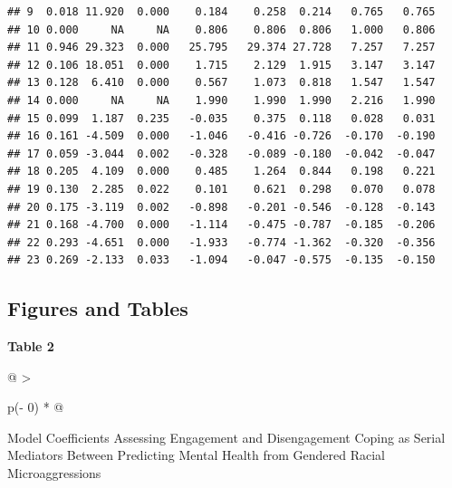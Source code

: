 \documentclass[
  11pt,
]{book}
\begin{document}
\begin{verbatim}
## 9  0.018 11.920  0.000    0.184    0.258  0.214   0.765   0.765
## 10 0.000     NA     NA    0.806    0.806  0.806   1.000   0.806
## 11 0.946 29.323  0.000   25.795   29.374 27.728   7.257   7.257
## 12 0.106 18.051  0.000    1.715    2.129  1.915   3.147   3.147
## 13 0.128  6.410  0.000    0.567    1.073  0.818   1.547   1.547
## 14 0.000     NA     NA    1.990    1.990  1.990   2.216   1.990
## 15 0.099  1.187  0.235   -0.035    0.375  0.118   0.028   0.031
## 16 0.161 -4.509  0.000   -1.046   -0.416 -0.726  -0.170  -0.190
## 17 0.059 -3.044  0.002   -0.328   -0.089 -0.180  -0.042  -0.047
## 18 0.205  4.109  0.000    0.485    1.264  0.844   0.198   0.221
## 19 0.130  2.285  0.022    0.101    0.621  0.298   0.070   0.078
## 20 0.175 -3.119  0.002   -0.898   -0.201 -0.546  -0.128  -0.143
## 21 0.168 -4.700  0.000   -1.114   -0.475 -0.787  -0.185  -0.206
## 22 0.293 -4.651  0.000   -1.933   -0.774 -1.362  -0.320  -0.356
## 23 0.269 -2.133  0.033   -1.094   -0.047 -0.575  -0.135  -0.150
\end{verbatim}

\hypertarget{figures-and-tables-2}{%
\subsection{Figures and Tables}\label{figures-and-tables-2}}

\textbf{Table 2 }

\begin{longtable}[]{@{}
  >{\raggedright\arraybackslash}p{(\columnwidth - 0\tabcolsep) * }@{}}
\toprule
\begin{minipage}[b]{\linewidth}\raggedright
Model Coefficients Assessing Engagement and Disengagement Coping as Serial Mediators Between Predicting Mental Health from Gendered Racial Microaggressions
\end{minipage} \\
\midrule
\endhead
\bottomrule
\end{longtable}
\end{document}
